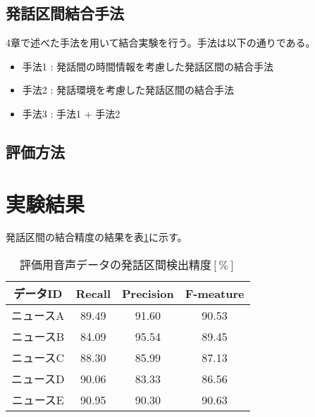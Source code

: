 \subsection{発話区間結合手法}
4章で述べた手法を用いて結合実験を行う。手法は以下の通りである。

\begin{itemize}
\item 手法1 : 発話間の時間情報を考慮した発話区間の結合手法
\item 手法2 : 発話環境を考慮した発話区間の結合手法
\item 手法3 : 手法1 + 手法2
\end{itemize}\par\par

\subsection{評価方法}

\section{実験結果}
発話区間の結合精度の結果を表\ref{table:result_connect}に示す。

\begin{table}[htb]
  \begin{center}
    \caption{評価用音声データの発話区間検出精度$[\%]$ \label{table:result_connect}}
    \begin{tabular}{|c||c|c|c|} \hline
      データID & Recall & Precision & F-meature \\ \hline
      ニュースA & 89.49 & 91.60 & 90.53 \\ \hline
      ニュースB & 84.09 & 95.54 & 89.45\\ \hline
      ニュースC & 88.30 & 85.99 & 87.13 \\ \hline
      ニュースD & 90.06 & 83.33 & 86.56\\ \hline
      ニュースE & 90.95 & 90.30 & 90.63\\ \hline
    \end{tabular}
  \end{center}
   
\end{table}